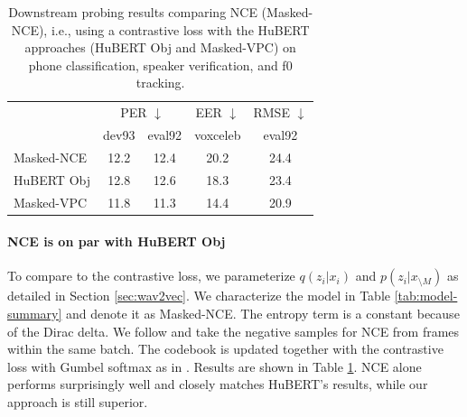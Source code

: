 \begin{table}
    \caption{Downstream probing results comparing NCE (Masked-NCE), i.e., using a contrastive loss with the HuBERT approaches (HuBERT Obj and Masked-VPC) on phone classification, speaker verification, and f0 tracking.}
    \label{tab:downstream3}
    \centering
    \footnotesize
    \begin{tabularx}{0.98\linewidth}{lcccc}
    \toprule
       &\multicolumn{2}{c}{PER $\downarrow$} &EER $\downarrow$ &RMSE $\downarrow$  \\
       &dev93 &eval92 &voxceleb &eval92  \\[1pt]
    \midrule                                                                                                                 
    Masked-NCE       &12.2          &12.4      &20.2        &24.4       \\
    HuBERT Obj           &12.8          &12.6      &18.3        &23.4       \\
    Masked-VPC       &11.8          &11.3      &14.4        &20.9       \\
    \bottomrule
    \end{tabularx}
\end{table}

\paragraph{NCE is on par with HuBERT Obj}

%
%
%
%
%

To compare to the contrastive loss, we parameterize $q(z_i|x_i)$ and $p(z_i | x_{\setminus M})$ as detailed in Section \ref{sec:wav2vec}. 
We characterize the model in Table \ref{tab:model-summary} and denote it as Masked-NCE.
The entropy term is a constant because of the Dirac delta.
%
We follow \citet{baevski2020wav2vec} and take the negative samples for NCE from frames within the same batch.
The codebook is updated together with the contrastive loss with Gumbel softmax as in \citet{baevski2020wav2vec}.
Results are shown in Table \ref{tab:downstream3}.
NCE alone performs surprisingly well and closely matches HuBERT's results, while our approach is still superior.
%

%
%
%
%
%
%
%
%


%
%
%

%
%
%
%
%
%
%
%
%
%
%

%
%
%
%
%
%
%
%

%
%
%
%

%
%
%
%


